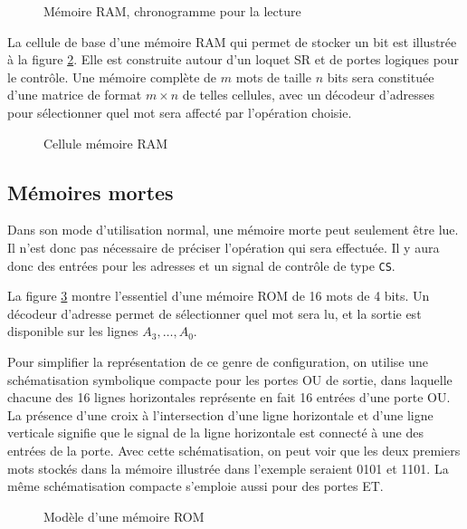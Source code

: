 \documentclass[11pt]{article}
\begin{document}
\begin{figure}[htbp]
\centering

\caption{\label{fig:orgc495527}Mémoire RAM, chronogramme pour la lecture}
\end{figure}

La cellule de base d'une mémoire RAM qui permet de stocker un bit est
illustrée à la figure \ref{fig:orgfe7786f}. Elle est construite autour d'un
loquet SR et de portes logiques pour le contrôle. Une mémoire complète
de \(m\) mots de taille \(n\) bits sera constituée d'une matrice de
format \(m \times n\) de telles cellules, avec un décodeur d'adresses
pour sélectionner quel mot sera affecté par l'opération choisie.

\begin{figure}[htbp]
\centering

\caption{\label{fig:orgfe7786f}Cellule mémoire RAM}
\end{figure}


\subsection{Mémoires mortes}
\label{sec:org12497a0}

Dans son mode d'utilisation normal, une mémoire morte peut seulement
être lue. Il n'est donc pas nécessaire de préciser l'opération qui
sera effectuée. Il y aura donc des entrées pour les adresses et un
signal de contrôle de type \texttt{CS}.

La figure \ref{fig:org6fe54b9} montre l'essentiel d'une mémoire ROM de
16 mots de 4 bits. Un décodeur d'adresse permet de sélectionner quel
mot sera lu, et la sortie est disponible sur les lignes \(A_3, \ldots,
A_0\). 

Pour simplifier la représentation de ce genre de configuration, on
utilise une schématisation symbolique compacte pour les portes OU de
sortie, dans laquelle chacune des 16 lignes horizontales représente en
fait 16 entrées d'une porte OU. La présence d'une croix à
l'intersection d'une ligne horizontale et d'une ligne verticale
signifie que le signal de la ligne horizontale est connecté à une des
entrées de la porte.  Avec cette schématisation, on peut voir que les
deux premiers mots stockés dans la mémoire illustrée dans l'exemple
seraient 0101 et 1101. La même schématisation compacte s'emploie aussi
pour des portes ET.


\begin{figure}[htbp]
\centering

\caption{\label{fig:org6fe54b9}Modèle d'une mémoire ROM}
\end{figure}
\end{document}
